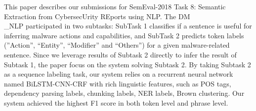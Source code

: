 This paper describes our submissions for SemEval-2018 Task 8: Semantic Extraction from CybersecUrity REports using NLP. The DM\\_NLP participated in two subtasks: SubTask 1 classifies if a sentence is useful for inferring malware actions and capabilities, and SubTask 2 predicts token labels (''Action'', ``Entity'', ``Modifier'' and ``Others'') for a given malware-related sentence. Since we leverage results of Subtask 2 directly to infer the result of Subtask 1, the paper focus on the system solving Subtask 2. By taking Subtask 2 as a sequence labeling task, our system relies on a recurrent neural network named BiLSTM-CNN-CRF with rich linguistic features, such as POS tags, dependency parsing labels, chunking labels, NER labels, Brown clustering. Our system achieved the highest F1 score in both token level and phrase level.
